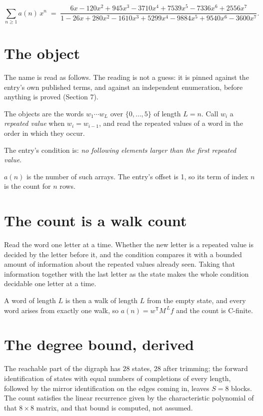 \documentclass[11pt]{article}
\theoremstyle{definition}
\begin{document}
\[\sum_{n \ge 1} a(n)\,x^n \;=\; \frac{6x - 120x^{2} + 945x^{3} - 3710x^{4} + 7539x^{5} - 7336x^{6} + 2556x^{7}}{1 - 26x + 280x^{2} - 1610x^{3} + 5299x^{4} - 9884x^{5} + 9540x^{6} - 3600x^{7}}.\]

\section{The object}

The name is read as follows. The reading is not a guess: it is pinned against the entry's own published terms, and against an independent enumeration, before anything is proved (Section 7).

The objects are the words $w_1\cdots w_L$ over $\{0,\dots,5\}$ of length $L = n$. Call $w_i$ a {\itshape repeated value} when $w_i = w_{i-1}$, and read the repeated values of a word in the order in which they occur.

The entry's condition is: {\itshape no following elements larger than the first repeated value}.

$a(n)$ is the number of such arrays. The entry's offset is 1, so its term of index $n$ is the count for $n$ rows.

\section{The count is a walk count}

Read the word one letter at a time. Whether the new letter is a repeated value is decided by the letter before it, and the condition compares it with a bounded amount of information about the repeated values already seen. Taking that information together with the last letter as the state makes the whole condition decidable one letter at a time.

A word of length $L$ is then a walk of length $L$ from the empty state, and every word arises from exactly one walk, so $a(n) = w^{\mathsf T}M^{\,L}f$ and the count is C-finite.

\section{The degree bound, derived}

The reachable part of the digraph has $28$ states, $28$ after trimming; the forward identification of states with equal numbers of completions of every length, followed by the mirror identification on the edges coming in, leaves $S = 8$ blocks. The count satisfies the linear recurrence given by the characteristic polynomial of that $8\times8$ matrix, and that bound is computed, not assumed.
\end{document}
